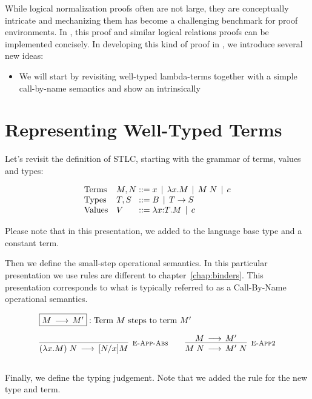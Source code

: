 While logical normalization proofs often are not large, they are
conceptually intricate and mechanizing them has become a challenging
benchmark for proof environments. In \beluga, this proof and similar
logical relations proofs can be implemented concisely. In developing
this kind of proof in \beluga, we introduce several new ideas:

\begin{itemize}
\item We will start by revisiting well-typed lambda-terms together with a
simple call-by-name semantics and show an intrinsically
\end{itemize}





\section{Representing Well-Typed Terms}

Let's revisit the definition of STLC, starting with the grammar of terms, values and types:

\[
\begin{array}{ll@{\bnfas}l}
\mbox{Terms} & M, N & x \bnfalt \lam x.M \bnfalt M \app N \bnfalt c\\
\mbox{Types} & T, S & B \bnfalt T \arrow S\\
\mbox{Values} & V & \lam x{:}T.M \bnfalt c
\end{array}
\]

Please note that in this presentation, we added to the language base
type and a constant term.

Then we define the small-step operational semantics. In this
particular presentation we use rules are different to
chapter~\ref{chap:binders}. This presentation corresponds to what is
typically referred to as a Call-By-Name operational semantics.

\[
\begin{array}{c}
\multicolumn{1}{l}{\fbox{$M \Steps M'$}: \mbox{Term $M$ steps to term $M'$}}
\\[1em]
\infer[\EAppBeta]{(\lam x.M) \app N \Steps [N/x]M}{} \qquad
\infer[\EAppArgStep]{M \app N \Steps M'\;N}{M \Steps M'} \\[1em]
\end{array}
\]

Finally, we define the typing judgement. Note that we added the rule
\TBase for the new type and term.

